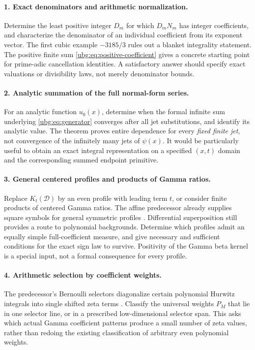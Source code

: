 \documentclass[11pt,letterpaper]{article}
\numberwithin{equation}{section}
\theoremstyle{definition}\newtheorem{definition}[theorem]{Definition}
\theoremstyle{remark}\newtheorem{remark}[theorem]{Remark}
\newcommand{\D}{\mathcal D}\newcommand{\NF}{\mathcal N}\newcommand{\HF}{\mathcal H}
\begin{document}
\paragraph{1. Exact denominators and arithmetic normalization.}
Determine the least positive integer $D_m$ for which $D_mN_m$ has
integer coefficients, and characterize the denominator of an individual
coefficient from its exponent vector. The first cubic example
$-3185/3$ rules out a blanket integrality statement. The positive finite
sum \eqref{ubg:eq:positive-coefficient} gives a concrete starting point
for prime-adic cancellation identities. A satisfactory answer should
specify exact valuations or divisibility laws, not merely denominator
bounds.

\paragraph{2. Analytic summation of the full normal-form series.}
For an analytic function $u_0(x)$, determine when the formal infinite
sum underlying \eqref{ubg:eq:generator} converges after all jet
substitutions, and identify its analytic value. The theorem proves
entire dependence for every \emph{fixed finite jet}, not convergence
of the infinitely many jets of $\psi(x)$. It would be particularly
useful to obtain an exact integral representation on a specified
$(x,t)$ domain and the corresponding summed endpoint primitive.

\paragraph{3. General centered profiles and products of Gamma ratios.}
Replace $K_t(\D)$ by an even profile with leading term $t$, or consider
finite products of centered Gamma ratios. The affine predecessor
already supplies square symbols for general symmetric profiles
\cite{Affine}. Differential superposition still provides a route to
polynomial backgrounds. Determine which profiles admit an equally
simple full-coefficient measure, and give necessary and sufficient
conditions for the exact sign law to survive. Positivity of the Gamma
beta kernel is a special input, not a formal consequence for every
profile.

\paragraph{4. Arithmetic selection by coefficient weights.}
The predecessor's Bernoulli selectors diagonalize certain polynomial
Hurwitz integrals into single shifted zeta terms \cite{Affine}.
Classify the universal weights $P_M$ that lie in one selector line,
or in a prescribed low-dimensional selector span. This asks which
actual Gamma coefficient patterns produce a small number of zeta
values, rather than redoing the existing classification of arbitrary
even polynomial weights.
\end{document}
